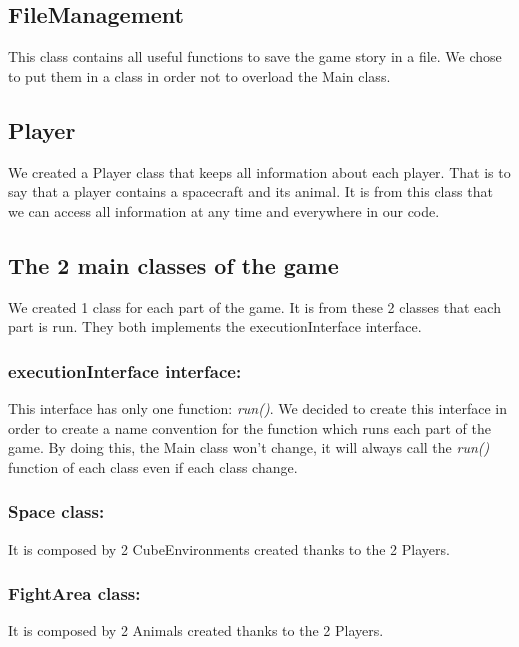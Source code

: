 \subsection{FileManagement}

This class contains all useful functions to save the game story in a file. 
We chose to put them in a class in order not to overload the Main class.

\subsection{Player}

We created a Player class that keeps all information about each player. 
That is to say that a player contains a spacecraft and its animal.
It is from this class that we can access all information at any time and everywhere in our code.

\subsection{The 2 main classes of the game}

We created 1 class for each part of the game. 
It is from these 2 classes that each part is run.
They both implements the executionInterface interface.

\subsubsection{executionInterface interface:}

This interface has only one function: \textit{run()}. 
We decided to create this interface in order to create a name convention for the function which runs each part of the game.
By doing this, the Main class won't change, it will always call the \textit{run()} function of each class even if each class change.

\subsubsection{Space class:}

It is composed by 2 CubeEnvironments created thanks to the 2 Players.

\subsubsection{FightArea class:}

It is composed by 2 Animals created thanks to the 2 Players.


